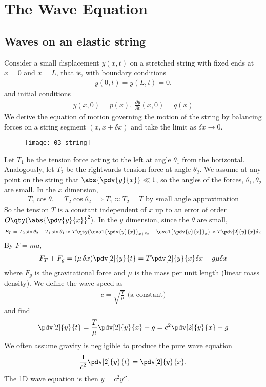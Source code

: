 \section{The Wave Equation}

\subsection{Waves on an elastic string}
Consider a small displacement $y(x,t)$ on a stretched string with fixed ends at $x = 0$ and $x = L$, that is, with boundary conditions
\begin{align} \label{eq:3.1}
	y(0,t) = y(L,t) = 0.
\end{align} 
and initial conditions
\begin{align} \label{eq:3.2}
	y(x, 0) = p(x),\ \frac{\partial y}{\partial t}(x,0) = q(x)
\end{align} 
We derive the equation of motion governing the motion of the string by balancing forces on a string segment $(x,x+\delta x)$ and take the limit as $\delta x \to 0$.
\begin{figure}[h] 
	\centering 
	\texttt{[image: 03-string]} 
\end{figure}

Let $T_1$ be the tension force acting to the left at angle $\theta_1$ from the horizontal.
Analogously, let $T_2$ be the rightwards tension force at angle $\theta_2$.
We assume at any point on the string that $\abs{\pdv{y}{x}} \ll 1$, so the angles of the forces, $\theta_1, \theta_2$ are small.
In the $x$ dimension,
\begin{align*}
	T_1 \cos \theta_1 = T_2 \cos \theta_2 \implies T_1 \approx T_2 = T \text{ by small angle approximation}
\end{align*}
So the tension $T$ is a constant independent of $x$ up to an error of order $O\qty(\abs{\pdv{y}{x}
}^2)$.
In the $y$ dimension, since the $\theta$ are small,
\begin{align*}
	F_T = T_2 \sin \theta_2 - T_1 \sin \theta_1 \approx T \qty(\eval{\pdv{y}{x}}_{x + \delta x} - \eval{\pdv{y}{x}}_x) \approx T \pdv[2]{y}{x} \delta x
\end{align*}
By $F = ma$,
\begin{align*}
	F_T + F_g = (\mu \, \delta x) \pdv[2]{y}{t} = T \pdv[2]{y}{x} \delta x - g \mu \delta x
\end{align*}
where $F_g$ is the gravitational force and $\mu$ is the mass per unit length (linear mass density).
We define the wave speed as
\begin{align*}
	c = \sqrt{\frac{T}{\mu}} \text{ (a constant)}
\end{align*}
and find
\begin{align}
	\pdv[2]{y}{t} = \frac{T}{\mu} \pdv[2]{y}{x} - g = c^2 \pdv[2]{y}{x} - g \label{eq:3.3}
\end{align}
We often assume gravity is negligible to produce the pure wave equation
\begin{align} \label{eq:3.4}
	\frac{1}{c^2} \pdv[2]{y}{t} = \pdv[2]{y}{x}.
\end{align}
The 1D wave equation is then $\ddot{y} = c^2 y''$.

